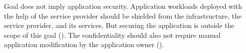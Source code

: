 Goal  does not imply application security. Application workloads
deployed with the help of the service provider should be shielded from the
infrastructure, the service provider, and its services. But securing the
application is outside the scope of this goal (). The
confidentiality should also not require manual application modification by the
application owner ().


